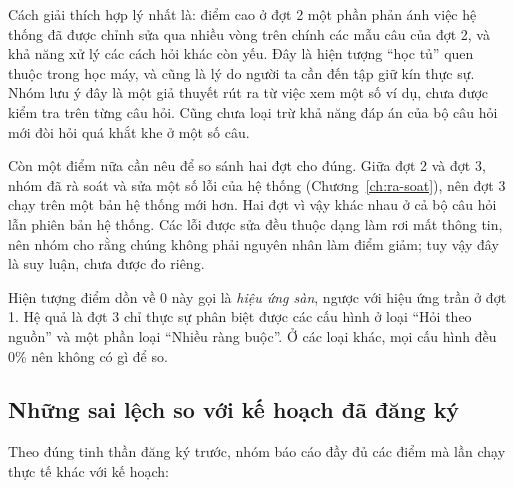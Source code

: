Cách giải thích hợp lý nhất là: điểm cao ở đợt 2 một phần phản ánh việc hệ thống đã được chỉnh sửa qua nhiều vòng trên chính các mẫu câu của đợt 2, và khả năng xử lý các cách hỏi khác còn yếu. Đây là hiện tượng ``học tủ'' quen thuộc trong học máy, và cũng là lý do người ta cần đến tập giữ kín thực sự. Nhóm lưu ý đây là một giả thuyết rút ra từ việc xem một số ví dụ, chưa được kiểm tra trên từng câu hỏi. Cũng chưa loại trừ khả năng đáp án của bộ câu hỏi mới đòi hỏi quá khắt khe ở một số câu.

Còn một điểm nữa cần nêu để so sánh hai đợt cho đúng. Giữa đợt 2 và đợt 3, nhóm đã rà soát và sửa một số lỗi của hệ thống (Chương~\ref{ch:ra-soat}), nên đợt 3 chạy trên một bản hệ thống mới hơn. Hai đợt vì vậy khác nhau ở cả bộ câu hỏi lẫn phiên bản hệ thống. Các lỗi được sửa đều thuộc dạng làm rơi mất thông tin, nên nhóm cho rằng chúng không phải nguyên nhân làm điểm giảm; tuy vậy đây là suy luận, chưa được đo riêng.

Hiện tượng điểm dồn về 0 này gọi là \emph{hiệu ứng sàn}, ngược với hiệu ứng trần ở đợt 1. Hệ quả là đợt 3 chỉ thực sự phân biệt được các cấu hình ở loại ``Hỏi theo nguồn'' và một phần loại ``Nhiều ràng buộc''. Ở các loại khác, mọi cấu hình đều 0\% nên không có gì để so.

\subsection{Những sai lệch so với kế hoạch đã đăng ký}

Theo đúng tinh thần đăng ký trước, nhóm báo cáo đầy đủ các điểm mà lần chạy thực tế khác với kế hoạch:

